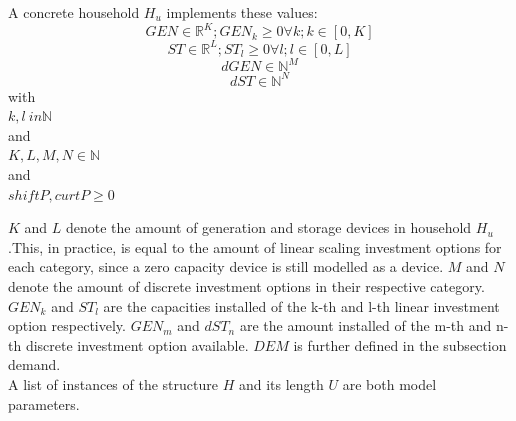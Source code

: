 \documentclass[
	11pt,								%
	DIV10,								%
	a4paper,         					%
	oneside,							%
	headheight=20pt,					%
	footheight=20pt,					%
    parskip=full,						%
    listof=totoc,						%
	bibliography=totoc,					%
	index=totoc,						%
]{scrartcl}
\begin{document}
A concrete household $H_u$ implements these values:
\begin{equation}
	GEN \in \mathbb{R}^{K}; GEN_k \geq 0 \forall k; k\in [0,K]
\end{equation}
\begin{equation}
	ST \in \mathbb{R}^{L}; ST_l \geq 0 \forall l; l\in [0,L] 
\end{equation}
\begin{equation}
	dGEN \in \mathbb{N}^{M}
\end{equation}
\begin{equation}
	dST \in \mathbb{N}^{N}
\end{equation}
with\\
$k,l\ in \mathbb{N}$\\
and\\
$K,L,M,N \in \mathbb{N}$\\
and\\
$shiftP, curtP \geq 0$

$K$ and $L$ denote the amount of generation and storage devices in household $H_u$.This, in practice, is equal to the amount of linear scaling investment options for each category, since a zero capacity device is still modelled as a device. $M$ and $N$ denote the amount of discrete investment options in their respective category. $GEN_k$ and $ST_l$ are the capacities installed of the k-th and l-th linear investment option respectively. $GEN_m$ and $dST_n$ are the amount installed of the m-th and n-th discrete investment option available. $DEM$ is further defined in the subsection demand.
\\
A list of instances of the structure $H$ and its length $U$ are both model parameters.
\end{document}
